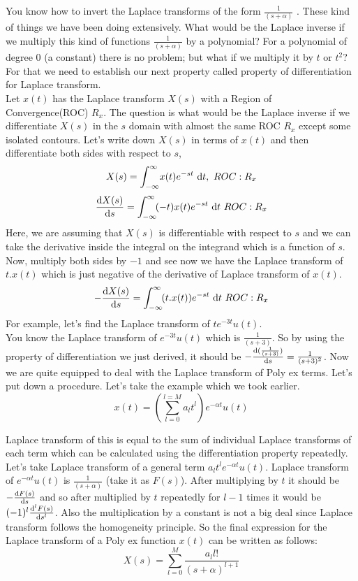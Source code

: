 You know how to invert the Laplace transforms of the form  $\frac{1}{(s+\alpha)}$ . These kind of things we have been doing extensively. What would be the Laplace inverse if we multiply this kind of functions $\frac{1}{(s+\alpha)}$ by a polynomial? For a polynomial of degree $0$ (a constant) there is no problem; but what if we multiply it by $t$ or $t^2$? For that we need to establish our next property called property of differentiation for Laplace transform.\\
Let $x(t)$ has the Laplace transform $X(s)$ with a Region of Convergence(ROC)  $R_x$. The question is what would be the Laplace inverse if we differentiate $X(s)$ in the $s$ domain with almost the same ROC $R_x$ except some isolated contours. 
Let’s write down $X(s)$ in terms of $x(t)$ and then differentiate both sides with respect to $s$,
\[
X(s)=\int_{-\infty}^{\infty} \! x(t)e^{-st} \ \mathrm{d} t, \ ROC : R_x
\]
\[
\frac{\mathrm{d} X(s)}{\mathrm{d} s}=\int_{-\infty}^{\infty} \! (-t)x(t)e^{-st} \ \mathrm{d} t \ ROC : R_x
\]
Here, we are assuming that $X(s)$ is differentiable with respect to $s$ and we can take the derivative inside the integral on the integrand which is a function of $s$.
Now, multiply both sides by $-1$ and see now we have the Laplace transform of $t.x(t)$ which is just negative of the derivative of Laplace transform of $x(t)$.
\[
-\frac{\mathrm{d} X(s)}{\mathrm{d} s}=\int_{-\infty}^{\infty} \! (t.x(t))e^{-st} \ \mathrm{d} t \ ROC : R_x
\]
For example, let's find the Laplace transform of $te^{-3t} u(t)$.\\
You know the Laplace transform of $e^{-3t} u(t)$ which is $\frac{1}{(s+3)}$. So by using the property of differentiation we just derived, it should be $-\frac{\mathrm{d}(\frac{1}{(s+3)})}{\mathrm{d} s} = \frac{1}{(s+3)^2}$.
Now we are quite equipped to deal with the Laplace transform of Poly ex terms. Let’s put down a procedure. Let’s take the example which we took earlier.
\[ x(t)=(\sum_{l=0}^{l=M} a_l t^l )e^{-\alpha t} u(t) \]

Laplace transform of this is equal to the sum of individual Laplace transforms of each term which can be calculated using the differentiation property repeatedly.
Let’s take Laplace transform of a general term  $a_l t^l e^{-\alpha t} u(t)$.
Laplace transform of $e^{-\alpha t} u(t)$  is   $\frac{1}{(s+\alpha)}$ (take it as $F(s)$). After multiplying by $t$ it should be $-\frac{\mathrm{d} F(s)}{\mathrm{d} s}$ and so after multiplied by $t$ repeatedly for $l-1$ times it would be $(-1)^l \frac{\mathrm{d}^l F(s)}{\mathrm{d} s^l}$. Also the multiplication by a constant is not a big deal since Laplace transform follows the homogeneity principle. So the final expression for the Laplace transform of a Poly ex function $x(t)$ can be written as follows:
\[
X(s)=\sum_{l=0}^{M}\frac{a_l  l!}{(s+\alpha)^{l+1}} 
\]
